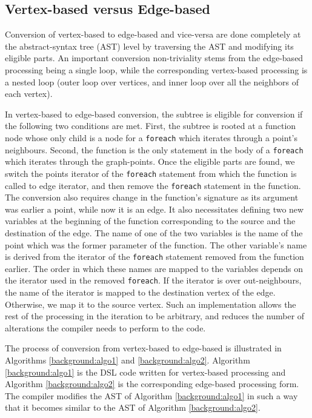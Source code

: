 \documentclass[12pt]{article}
\begin{document}
\subsection{Vertex-based versus Edge-based}\label{sec:vertexedge}
Conversion of vertex-based to edge-based and vice-versa are done completely at the abstract-syntax tree (AST) level  by traversing the AST and modifying its eligible parts. An important conversion non-triviality stems from the edge-based processing being a single loop, while the corresponding vertex-based processing is a nested loop (outer loop over vertices, and inner loop over all the neighbors of each vertex).

In vertex-based to edge-based conversion,  the subtree is eligible for conversion if the following two conditions are met. 
First, the subtree is rooted at a function node whose only child is a node for a \texttt{foreach} which iterates through a point's neighbours. 
Second, the function is the only statement in the body of a \texttt{foreach} which iterates through the graph-points. 
Once the eligible parts are found, we switch the points iterator of the \texttt{foreach} statement from which the function is called to edge iterator, and then remove the \texttt{foreach} statement in the function. 
The conversion also requires change in the function's signature as its argument was earlier a point, while now it is an edge. 
It also necessitates defining two new variables at the beginning of the function corresponding to the source and the destination of the edge. 
The name of one of the two variables is the name of the point which was the former parameter of the function. 
The other variable's name is derived from the iterator of the \texttt{foreach} statement removed from the function earlier. 
The order in which these names are mapped to the variables depends on the iterator used in the removed \texttt{foreach}. 
If the iterator is over out-neighbours, the name of the iterator is mapped to the destination vertex of the edge.
Otherwise, we map it to the source vertex. 
Such an implementation allows the rest of the processing in the iteration to be arbitrary, and reduces the number of alterations the compiler needs to perform to the code.

The process of conversion from vertex-based to edge-based is illustrated in Algorithms \ref{background:algo1} and \ref{background:algo2}.
Algorithm \ref{background:algo1} is the DSL code written for vertex-based processing and Algorithm \ref{background:algo2} is the corresponding edge-based processing form.
The compiler modifies the AST of Algorithm \ref{background:algo1} in such a way that it becomes similar to the AST of Algorithm \ref{background:algo2}.
\end{document}
